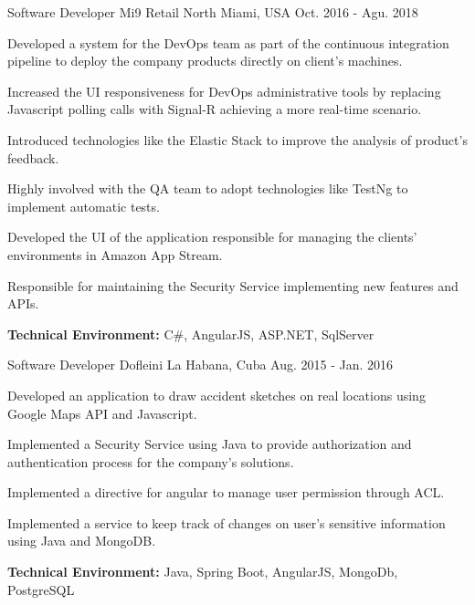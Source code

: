 \begin{cventries}
\workexperienceentry
{Software Developer} %
{Mi9 Retail} %
{North Miami, USA} %
{Oct. 2016 - Agu. 2018} %
{ %
\begin{cvitems}
    \item {Developed a system for the DevOps team as part of the continuous integration pipeline to deploy the company products directly on client's machines.}
    \item {Increased the UI responsiveness for DevOps administrative tools by replacing Javascript polling calls with Signal-R achieving a more real-time scenario.}
    \item {Introduced technologies like the Elastic Stack to improve the analysis of  product's feedback.}  
    \item {Highly involved with the QA team to adopt technologies like TestNg to implement automatic tests.}
    \item {Developed the UI of the application responsible for managing the clients' environments in Amazon App Stream.}
    \item {Responsible for maintaining the Security Service implementing new features and APIs.}
\end{cvitems}
}
{\textbf{Technical Environment:} C\#, AngularJS, ASP.NET, SqlServer}


\workexperienceentry
{Software Developer} %
{Dofleini} %
{La Habana, Cuba} %
{Aug. 2015 - Jan. 2016} %
{ %
\begin{cvitems}
	\item {Developed an application to draw accident sketches on real locations using Google Maps API and
		Javascript.}
	\item {Implemented a Security Service using Java to provide authorization and authentication
	process for the company's solutions.}
	\item {Implemented a directive for angular to manage user permission through ACL.}
	\item {Implemented a service to keep track of changes on user's sensitive information using Java and MongoDB.}
\end{cvitems}
}
{\textbf{Technical Environment:} Java, Spring Boot, AngularJS, MongoDb, PostgreSQL}




\end{cventries}
